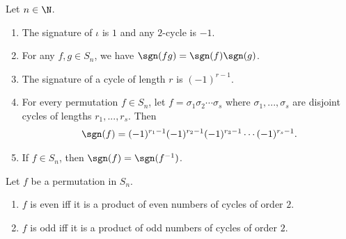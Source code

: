\documentclass{article}
\begin{document}
\begin{lemma}
	Let $n\in\N$.
	\begin{enumerate}
		\item The signature of $\iota$ is $1$ and any $2$-cycle is $-1$.
		\item For any $f,g\in S_n$, we have $\sgn(fg)=\sgn(f)\sgn(g)$.
		\item The signature of a cycle of length $r$ is $(-1)^{r-1}$.
		\item For every permutation $f\in S_n$, let $f=\sigma_1\sigma_2\cdots \sigma_s$ where $\sigma_1,...,\sigma_s$ are disjoint cycles of lengths $r_1,...,r_s$. Then
		      \begin{align*}
			      \sgn(f)=(-1)^{r_1-1}(-1)^{r_2-1}(-1)^{r_3-1}\cdots(-1)^{r_s-1}.
		      \end{align*}
		\item If $f\in S_n$, then $\sgn(f)=\sgn(f^{-1})$.
	\end{enumerate}
\end{lemma}
\begin{corollary}
	Let $f$ be a permutation in $S_n$.
	\begin{enumerate}
		\item $f$ is even iff it is a product of even numbers of cycles of order $2$.
		\item $f$ is odd iff it is a product of odd numbers of cycles of order $2$.
	\end{enumerate}
\end{corollary}
\end{document}
